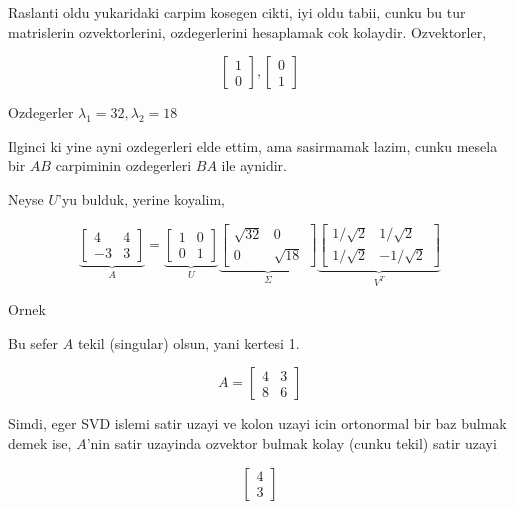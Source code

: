 \documentclass[12pt,fleqn]{article}\usepackage{../common}
\begin{document}
Raslanti oldu yukaridaki carpim kosegen cikti, iyi oldu tabii, cunku bu tur
matrislerin ozvektorlerini, ozdegerlerini hesaplamak cok
kolaydir. Ozvektorler, 

\[ 
\left[\begin{array}{r}
1 \\ 0
\end{array}\right],
\left[\begin{array}{r}
0 \\ 1
\end{array}\right]
 \]

Ozdegerler $\lambda_1 = 32, \lambda_2 = 18$

Ilginci ki yine ayni ozdegerleri elde ettim, ama sasirmamak lazim, cunku
mesela bir $AB$ carpiminin ozdegerleri $BA$ ile aynidir. 

Neyse $U$'yu bulduk, yerine koyalim, 

\[ 
\underbrace{
\left[\begin{array}{rr}
4 & 4 \\ -3 & 3
\end{array}\right] 
}_{A}
=
\underbrace{
\left[\begin{array}{rr}
1 & 0 \\ 0 & 1 
\end{array}\right]
}_{U}
\underbrace{
\left[\begin{array}{rr}
\sqrt{ 32} & 0 \\ 0 & \sqrt{ 18}
\end{array}\right]
}_{\Sigma}
\underbrace{
\left[\begin{array}{rr}
1/\sqrt{ 2} & 1/\sqrt{ 2} \\ 1/\sqrt{ 2} & -1/\sqrt{ 2}
\end{array}\right]
}_{V^T}
 \]

Ornek 

Bu sefer $A$ tekil (singular) olsun, yani kertesi 1. 

\[ A = \left[\begin{array}{rr}
4 & 3 \\ 8 & 6
\end{array}\right] \]

Simdi, eger SVD islemi satir uzayi ve kolon uzayi icin ortonormal bir baz
bulmak demek ise, $A$'nin satir uzayinda ozvektor bulmak kolay (cunku
tekil) satir uzayi

\[ 
\left[\begin{array}{r}
4 \\ 3
\end{array}\right]
 \]
\end{document}
